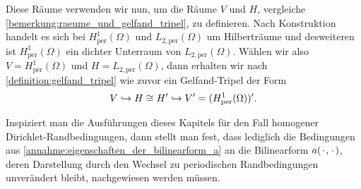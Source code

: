 Diese Räume verwenden wir nun, um die Räume $V$ und $H$, vergleiche \cref{bemerkung:raeume_und_gelfand_tripel}, zu definieren.
Nach Konstruktion handelt es sich bei $H^{1}_{\text{per}}(\Omega)$ und $L_{2,\text{per}}(\Omega)$ um Hilberträume und desweiteren ist $H^{1}_{\text{per}}(\Omega)$ ein dichter Unterraum von $L_{2,\text{per}}(\Omega)$.
Wählen wir also $V = H^{1}_{\text{per}}(\Omega)$ und $H = L_{2,\text{per}}(\Omega)$, dann erhalten wir nach \cref{definition:gelfand_tripel} wie zuvor ein Gelfand-Tripel der Form
\begin{equation}
    V \hookrightarrow H \cong H' \hookrightarrow V' = (H^{1}_{\text{per}}(\Omega))'.
\end{equation}

Inspiziert man die Ausführungen dieses Kapitels für den Fall homogener Dirichlet-Randbedingungen, dann stellt man fest, dass lediglich die Bedingungen aus \cref{annahme:eigenschaften_der_bilinearform_a} an die Bilinearform $a({\mkern2mu\cdot\mkern2mu}, {\mkern2mu\cdot\mkern2mu})$, deren Darstellung durch den Wechsel zu periodischen Randbedingungen unverändert bleibt, nachgewiesen werden müssen.


